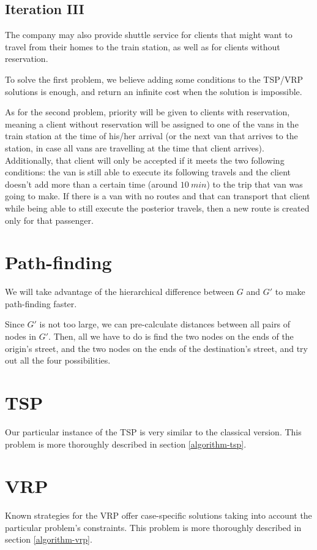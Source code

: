 \subsection{Iteration III}
The company may also provide shuttle service for clients that might want to travel from their homes to the train station, as well as for clients without reservation.\par
To solve the first problem, we believe adding some conditions to the TSP/VRP solutions is enough, and return an infinite cost when the solution is impossible.\par
As for the second problem, priority will be given to clients with reservation, meaning a client without reservation will be assigned to one of the vans in the train station at the time of his/her arrival (or the next van that arrives to the station, in case all vans are travelling at the time that client arrives). Additionally, that client will only be accepted if it meets the two following conditions: the van is still able to execute its following travels and the client doesn't add more than a certain time (around $\SI{10}{min}$) to the trip that van was going to make. If there is a van with no routes and that can transport that client while being able to still execute the posterior travels, then a new route is created only for that passenger.
\section{Path-finding} \label{problem-decomposition-pathfinding}
We will take advantage of the hierarchical difference between $G$ and $G'$ to make path-finding faster.\par
Since $G'$ is not too large, we can pre-calculate distances between all pairs of nodes in $G'$.
Then, all we have to do is find the two nodes on the ends of the origin's street, and the two nodes on the ends of the destination's street, and try out all the four possibilities.
\section{\texorpdfstring{\Acrlong*{TSP}}{Travelling salesman problem}} \label{problem-decomposition-tsp}
Our particular instance of the \acrshort{TSP} is very similar to the classical version. This problem is more thoroughly described in section \ref{algorithm-tsp}.
\section{\texorpdfstring{\Acrlong*{VRP}}{Vehicle routing problem}} \label{problem-decomposition-vrp}
Known strategies for the \acrshort{VRP} offer case-specific solutions taking into account the particular problem's constraints. This problem is more thoroughly described in section \ref{algorithm-vrp}.
